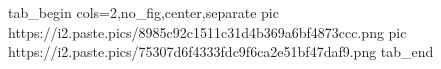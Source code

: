 
 
 
 
 

\ifcmt
  tab_begin cols=2,no_fig,center,separate
  	pic https://i2.paste.pics/8985c92c1511c31d4b369a6bf4873ccc.png
		pic https://i2.paste.pics/75307d6f4333fdc9f6ca2e51bf47daf9.png
  tab_end
\fi
